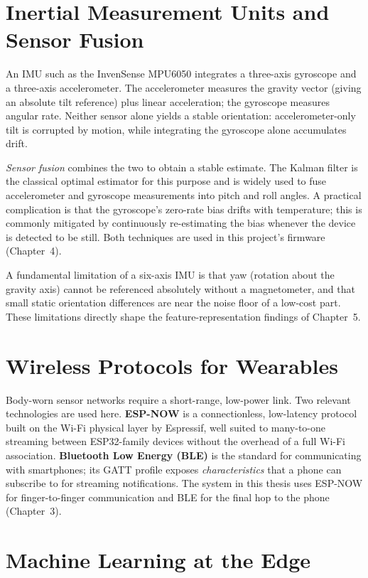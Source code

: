 \section{Inertial Measurement Units and Sensor Fusion}

An IMU such as the InvenSense MPU6050 \cite{mpu6050} integrates a three-axis
gyroscope and a three-axis accelerometer. The accelerometer measures the
gravity vector (giving an absolute tilt reference) plus linear acceleration;
the gyroscope measures angular rate. Neither sensor alone yields a stable
orientation: accelerometer-only tilt is corrupted by motion, while integrating
the gyroscope alone accumulates drift.

\emph{Sensor fusion} combines the two to obtain a stable estimate. The Kalman
filter \cite{kalman} is the classical optimal estimator for this purpose and is
widely used to fuse accelerometer and gyroscope measurements into pitch and
roll angles. A practical complication is that the gyroscope's zero-rate bias
drifts with temperature; this is commonly mitigated by continuously
re-estimating the bias whenever the device is detected to be still. Both
techniques are used in this project's firmware (Chapter~4).

A fundamental limitation of a six-axis IMU is that yaw (rotation about the
gravity axis) cannot be referenced absolutely without a magnetometer, and that
small static orientation differences are near the noise floor of a low-cost
part. These limitations directly shape the feature-representation findings of
Chapter~5.

\section{Wireless Protocols for Wearables}

Body-worn sensor networks require a short-range, low-power link. Two relevant
technologies are used here. \textbf{ESP-NOW} \cite{espnow} is a connectionless,
low-latency protocol built on the Wi-Fi physical layer by Espressif, well
suited to many-to-one streaming between ESP32-family devices without the
overhead of a full Wi-Fi association. \textbf{Bluetooth Low Energy (BLE)} is
the standard for communicating with smartphones; its GATT profile exposes
\emph{characteristics} that a phone can subscribe to for streaming
notifications. The system in this thesis uses ESP-NOW for finger-to-finger
communication and BLE for the final hop to the phone (Chapter~3).

\section{Machine Learning at the Edge}

